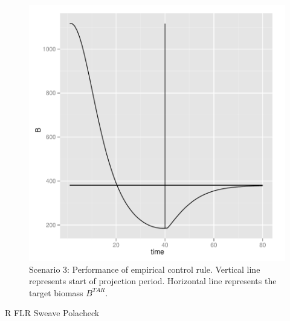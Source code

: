 \documentclass[a4paper]{article}
\begin{document}
\begin{figure}
\centering
\includegraphics{script-hcr_plot_sc3}
\caption{Scenario 3: Performance of empirical control rule. Vertical line represents start of projection period. 
Horizontal line represents the target biomass $B^{TAR}$.}
\label{fig:hcr_proj_biomass}
\end{figure}



\newpage


R
FLR
Sweave
Polacheck
\end{document}
